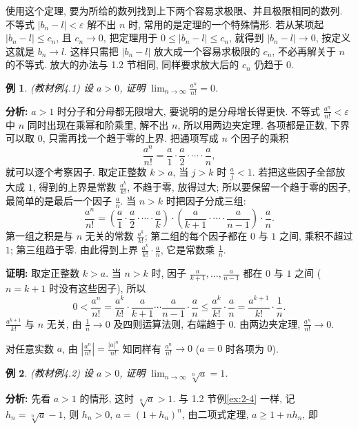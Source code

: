 \documentclass[UTF8,openany]{ctexbook}
\theoremstyle{chinesetextbook}
\newtheorem{example}{例}[section]
\newenvironment{cnproof}{\par\indent\textbf{证明:} \ignorespaces}{\par}
\begin{document}
使用这个定理, 要为所给的数列找到上下两个容易求极限、并且极限相同的数列. 不等式 $|b_n-l|<\varepsilon$ 解不出 $n$ 时, 常用的是定理的一个特殊情形. 若从某项起 $|b_n-l|\le c_n$, 且 $c_n\to0$, 把定理用于 $0\le|b_n-l|\le c_n$, 就得到 $|b_n-l|\to0$, 按定义这就是 $b_n\to l$. 这样只需把 $|b_n-l|$ 放大成一个容易求极限的 $c_n$, 不必再解关于 $n$ 的不等式. 放大的办法与 1.2 节相同, 同样要求放大后的 $c_n$ 仍趋于 $0$.
\begin{example}\label{ex:4-1}
\textnormal{(教材例4.1)} 设 $a>0$, 证明 $\displaystyle\lim_{n\to\infty}\frac{a^n}{n!}=0$.
\end{example}
\par\indent\textbf{分析:} $a>1$ 时分子和分母都无限增大, 要说明的是分母增长得更快. 不等式 $\displaystyle\frac{a^n}{n!}<\varepsilon$ 中 $n$ 同时出现在乘幂和阶乘里, 解不出 $n$, 所以用两边夹定理. 各项都是正数, 下界可以取 $0$, 只需再找一个趋于零的上界. 把通项写成 $n$ 个因子的乘积
\[
\frac{a^n}{n!}=\frac a1\cdot\frac a2\cdot\cdots\cdot\frac an,
\]
就可以逐个考察因子. 取定正整数 $k>a$, 当 $j>k$ 时 $\displaystyle\frac aj<1$. 若把这些因子全部放大成 $1$, 得到的上界是常数 $\displaystyle\frac{a^k}{k!}$, 不趋于零, 放得过大; 所以要保留一个趋于零的因子, 最简单的是最后一个因子 $\displaystyle\frac an$. 当 $n>k$ 时把因子分成三组:
\[
\frac{a^n}{n!}=\left(\frac a1\cdot\frac a2\cdot\cdots\cdot\frac ak\right)\cdot\left(\frac a{k+1}\cdot\cdots\cdot\frac a{n-1}\right)\cdot\frac an.
\]
第一组之积是与 $n$ 无关的常数 $\displaystyle\frac{a^k}{k!}$; 第二组的每个因子都在 $0$ 与 $1$ 之间, 乘积不超过 $1$; 第三组趋于零. 由此得到上界 $\displaystyle\frac{a^k}{k!}\cdot\frac an$, 它是常数乘 $\displaystyle\frac1n$.
\begin{cnproof}
取定正整数 $k>a$. 当 $n>k$ 时, 因子 $\displaystyle\frac a{k+1},\ldots,\frac a{n-1}$ 都在 $0$ 与 $1$ 之间 ($n=k+1$ 时没有这些因子), 所以
\[
0<\frac{a^n}{n!}=\frac{a^k}{k!}\cdot\frac a{k+1}\cdots\frac a{n-1}\cdot\frac an\le\frac{a^k}{k!}\cdot\frac an=\frac{a^{k+1}}{k!}\cdot\frac1n.
\]
$\displaystyle\frac{a^{k+1}}{k!}$ 与 $n$ 无关, 由 $\displaystyle\frac1n\to0$ 及四则运算法则, 右端趋于 $0$. 由两边夹定理, $\displaystyle\frac{a^n}{n!}\to0$.
\end{cnproof}
对任意实数 $a$, 由 $\displaystyle\left|\frac{a^n}{n!}\right|=\frac{|a|^n}{n!}$ 知同样有 $\displaystyle\frac{a^n}{n!}\to0$ ($a=0$ 时各项为 $0$).
\begin{example}\label{ex:4-2}
\textnormal{(教材例4.2)} 设 $a>0$, 证明 $\displaystyle\lim_{n\to\infty}\sqrt[n]a=1$.
\end{example}
\par\indent\textbf{分析:} 先看 $a>1$ 的情形, 这时 $\sqrt[n]a>1$. 与 1.2 节例\ref{ex:2-4} 一样, 记 $h_n=\sqrt[n]a-1$, 则 $h_n>0$, $a=(1+h_n)^n$, 由二项式定理, $a\ge1+nh_n$, 即
\end{document}
